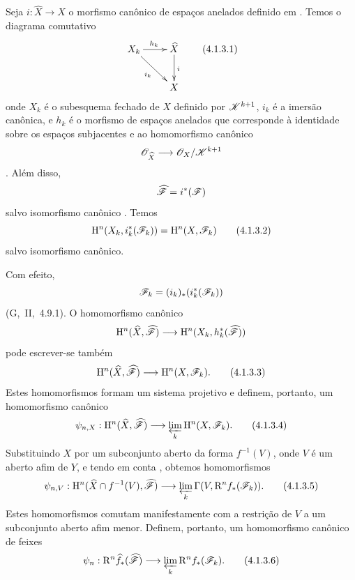 \begin{env}[4.1.3]
\label{III.4.1.3}
Seja $i:\widehat{X}\to X$ o morfismo canônico de espaços anelados
definido em .
Temos o diagrama comutativo
\[
  \xymatrix{
    X_k\ar[r]^{h_k}\ar[dr]_{i_k} &
    \widehat{X}\ar[d]^{i}\\
    & X
  }
  \tag{4.1.3.1}
  \label{III.4.1.3.1}
\]
onde $X_k$ é o subesquema fechado de $X$ definido por
$\mathscr{K}^{k+1}$, $i_k$ é a imersão canônica, e $h_k$ é o
morfismo de espaços anelados que corresponde à identidade sobre
os espaços subjacentes e ao homomorfismo canônico
\[
  \mathscr{O}_{\widehat{X}}
  \longrightarrow
  \mathscr{O}_X/\mathscr{K}^{k+1}
\]
.
Além disso,
\[
  \widehat{\mathscr{F}}=i^*(\mathscr{F})
\]
salvo isomorfismo canônico .
Temos
\[
  \HH^n(X_k,i_k^*(\sh{F}_k))
  =
  \HH^n(X,\sh{F}_k)
  \tag{4.1.3.2}
  \label{III.4.1.3.2}
\]
salvo isomorfismo canônico.


Com efeito,
\[
  \mathscr{F}_k=(i_k)_*(i_k^*(\mathscr{F}_k))
\]
(G,~II,~4.9.1).
O homomorfismo canônico
\[
  \mathrm{H}^n(\widehat{X},\widehat{\mathscr{F}})
  \longrightarrow
  \mathrm{H}^n(X_k,h_k^*(\widehat{\mathscr{F}}))
\]
 pode escrever-se também
\[
  \HH^n(\widehat{X},\widehat{\sh{F}})
  \longrightarrow
  \HH^n(X,\sh{F}_k).
  \tag{4.1.3.3}
  \label{III.4.1.3.3}
\]
Estes homomorfismos formam um sistema projetivo e definem, portanto,
um homomorfismo canônico
\[
  \psi_{n,X}:
  \HH^n(\widehat{X},\widehat{\sh{F}})
  \longrightarrow
  \varprojlim_k\HH^n(X,\sh{F}_k).
  \tag{4.1.3.4}
  \label{III.4.1.3.4}
\]
Substituindo $X$ por um subconjunto aberto da forma $f^{-1}(V)$,
onde $V$ é um aberto afim de $Y$, e tendo em conta
, obtemos homomorfismos
\[
  \psi_{n,V}:
  \HH^n(\widehat{X}\cap f^{-1}(V),\widehat{\sh{F}})
  \longrightarrow
  \varprojlim_k\Gamma(V,\RR^n f_*(\sh{F}_k)).
  \tag{4.1.3.5}
  \label{III.4.1.3.5}
\]
Estes homomorfismos comutam manifestamente com a restrição de $V$
a um subconjunto aberto afim menor.
Definem, portanto, um homomorfismo canônico de feixes
\[
  \psi_n:
  \RR^n\widehat{f}_*(\widehat{\sh{F}})
  \longrightarrow
  \varprojlim_k\RR^n f_*(\sh{F}_k).
  \tag{4.1.3.6}
  \label{III.4.1.3.6}
\]
\end{env}

